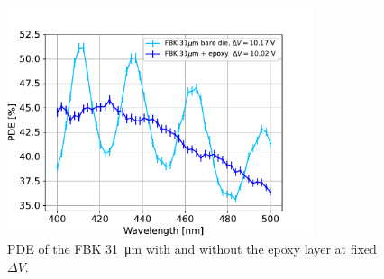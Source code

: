 \begin{figure}[htbp]
    \centering
    \includegraphics[width=0.8\textwidth]{gfx/plots/PDE/PDEcomp.pdf}  
    \caption{PDE of the FBK \SI{31}{\micro m} with and without the epoxy layer at fixed $\Delta V$.}
    \label{fig:pde comp epoxy}
\end{figure}


